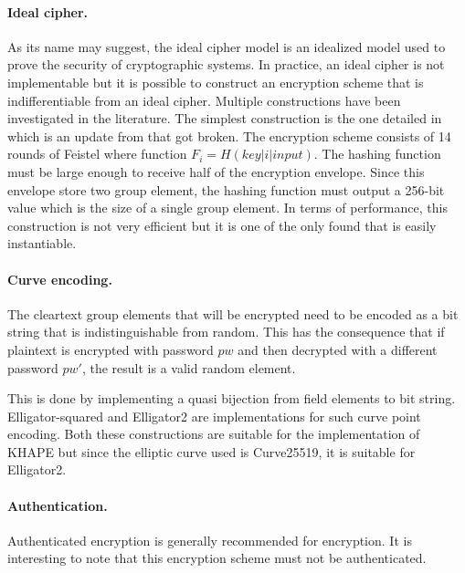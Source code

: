 ﻿\documentclass[../report.tex]{subfiles}
\begin{document}
\paragraph{Ideal cipher.}
As its name may suggest, the ideal cipher model is an idealized model used to prove the security of cryptographic systems.
In practice, an ideal cipher is not implementable %
but it is possible to construct an encryption scheme that is indifferentiable from an ideal cipher. Multiple constructions have been investigated in the literature.
The simplest construction is the one detailed in \cite{Ideal_Cipher_2} which is an update from \cite{Ideal_Cipher_1} that got broken.
The encryption scheme consists of 14 rounds of Feistel where function $F_i = H(key | i | input)$.
The hashing function must be large enough to receive half of the encryption envelope. Since this envelope store two group element, the hashing function must output a 256-bit value which is the size of a single group element.
In terms of performance, this construction is not very efficient but it is one of the only found that is easily instantiable.

\paragraph{Curve encoding.}
The cleartext group elements that will be encrypted need to be encoded as a bit string that is indistinguishable from random. This has the consequence that if plaintext is encrypted with password $pw$ and then decrypted with a different password $pw'$, the result is a valid random element.

This is done by implementing a quasi bijection from field elements to bit string.
Elligator-squared \cite{Elligator_Squared_Paper} and Elligator2 \cite{Elligator2_Paper} are implementations for such curve point encoding.
Both these constructions are suitable for the implementation of KHAPE but since the elliptic curve used is Curve25519, it is suitable for Elligator2.
\paragraph{Authentication.}
Authenticated encryption is generally recommended for encryption.
It is interesting to note that this encryption scheme must not be authenticated. 

\end{document}
